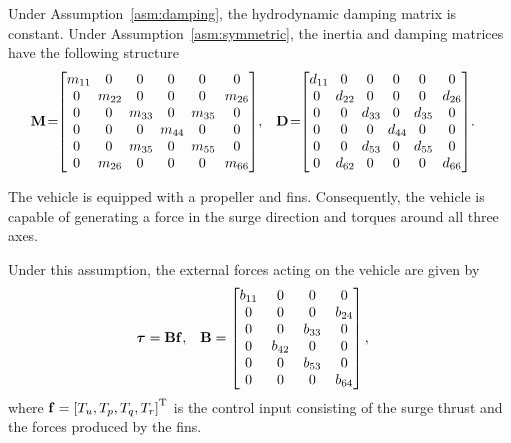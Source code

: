 \noindent Under Assumption~\ref{asm:damping}, the hydrodynamic damping matrix is constant.
Under Assumption~\ref{asm:symmetric}, the inertia and damping matrices have the following structure
\begin{align}
    \mat{M}\! &= \!\!
    \begin{bmatrix}
        m_{11}\!\! & 0 & 0 & 0 & 0 & 0\\ 0 & \!m_{22}\!\! & 0 & 0 & 0 & m_{26}\\ 0 & 0 & \!m_{33}\!\! & 0 & \!m_{35}\!\! & 0\\ 0 & 0 & 0 & \!m_{44}\!\! & 0 & 0\\ 0 & 0 & \!m_{35}\!\! & 0 & \!m_{55}\!\! & 0\\ 0 & \!m_{26}\!\! & 0 & 0 & 0 & m_{66}
    \end{bmatrix}\!, &
    \mat{D}\! &= \!\!
    \begin{bmatrix}
        d_{11}\!\! & 0 & 0 & 0 & 0 & 0\\ 0 & \!d_{22}\!\! & 0 & 0 & 0 & d_{26}\\ 0 & 0 & \!d_{33}\!\! & 0 & \!d_{35}\!\! & 0\\ 0 & 0 & 0 & \!d_{44}\!\! & 0 & 0\\ 0 & 0 & \!d_{53}\!\! & 0 & \!d_{55}\!\! & 0\\ 0 & \!d_{62}\!\! & 0 & 0 & 0 & d_{66}
    \end{bmatrix}\!.
\end{align}

\begin{asm}
    \label{asm:actuators}
    The vehicle is equipped with a propeller and fins.
    Consequently, the vehicle is capable of generating a force in the surge direction and torques around all three axes.
\end{asm}
Under this assumption, the external forces acting on the vehicle are given by
\begin{align}
    \bm{\tau} &= \mathbf{B}\mathbf{f}, &
    \mathbf{B} &= 
    \begin{bmatrix}
        b_{11} & 0 & 0 & 0 \\ 0 & 0 & 0 & b_{24} \\ 0 & 0 & b_{33} & 0 \\ 0 & b_{42} & 0 & 0 \\ 0 & 0 & b_{53} & 0 \\ 0 & 0 & 0 & b_{64}
    \end{bmatrix},
\end{align}
where $\mathbf{f} = \left[T_u, T_p, T_q, T_r\right]^{\mathrm{T}}$ is the control input consisting of the surge thrust and the forces produced by the fins.

